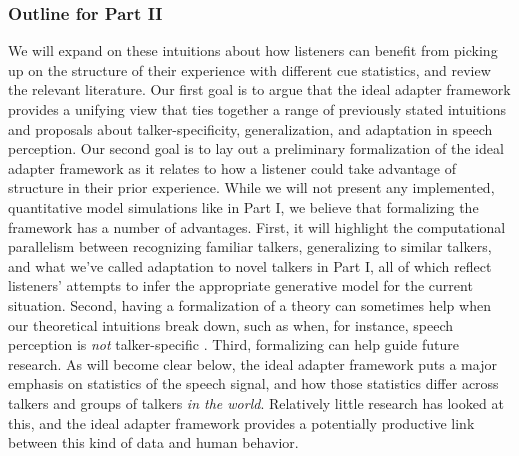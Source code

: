 \subsubsection{Outline for Part II}
\label{sec:outline-part-ii}

\label{r-formalization-benefits}
We will expand on these intuitions about how listeners can benefit from picking up on the structure of their experience with different cue statistics, and review the relevant literature.  Our first goal is to argue that the ideal adapter framework provides a unifying view that ties together a range of previously stated intuitions and proposals about talker-specificity, generalization, and adaptation in speech perception.  Our second goal is to lay out a preliminary formalization of the ideal adapter framework as it relates to how a listener could take advantage of structure in their prior experience.  While we will not present any implemented, quantitative model simulations like in Part I, we believe that formalizing the framework has a number of advantages.  First, it will highlight the computational parallelism between recognizing familiar talkers, generalizing to similar talkers, and what we've called adaptation to novel talkers in Part I, all of which reflect listeners' attempts to infer the appropriate generative model for the current situation.  Second, having a formalization of a theory can sometimes help when our theoretical intuitions break down, such as when, for instance, speech perception is \emph{not} talker-specific \autocite[e.g.][]{Kraljic2007}.  Third, formalizing can help guide future research.  As will become clear below, the ideal adapter framework puts a major emphasis on statistics of the speech signal, and how those statistics differ across talkers and groups of talkers \emph{in the world}.  Relatively little research has looked at this, and the ideal adapter framework provides a potentially productive link between this kind of data and human behavior.

